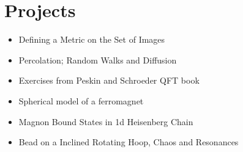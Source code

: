 
\section{Projects}



    \begin{itemize}
        \itemsep0cm
        \item Defining a Metric on the Set of Images\\
        \item  Percolation; Random Walks and Diffusion\\
        \item  Exercises from Peskin and Schroeder QFT book\\
        \item Spherical model of a ferromagnet\\
        \item Magnon Bound States in 1d Heisenberg Chain\\
        \item Bead on a Inclined Rotating Hoop, Chaos and Resonances\\
    \end{itemize}
    \vfill\hspace{1cm}


% 
% 
% 
% 
